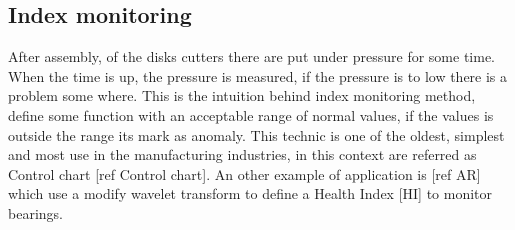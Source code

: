 \documentclass[../../main/main.tex]{subfiles}
\begin{document}
    \subsection{Index monitoring}
        After assembly, of the disks cutters there are put under pressure for some time. When the time is up, the 
        pressure is measured, if the pressure is to low there is a problem some where. This is the intuition behind index 
        monitoring method, define some function with an acceptable range of normal values, if the values is outside the range 
        its mark as anomaly. This technic is one of the oldest, simplest and most use in the manufacturing industries, in
        this context are referred as Control chart [ref Control chart]. An other example of application is [ref AR] which 
        use a modify wavelet transform to define a Health Index [HI] to monitor bearings. 

    \subsection{}

        
    
\end{document}
